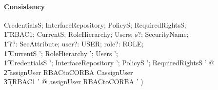 \paragraph{Consistency}
\begin{zed}
  \forall CredentialsS; InterfaceRepository; PolicyS; RequiredRightsS; \\
  \t1 RBAC1; CurrentS; RoleHierarchy; Users; s?: SecurityName; \\
  \t1 r?: SecAttribute; user?: USER; role?: ROLE; \\
  \t1 CurrentS '; RoleHierarchy '; Users '; \\
  \t1 CredentialsS '; InterfaceRepository '; PolicyS '; RequiredRightsS ' @ \\
  \t2 \pre assignUser \land RBACtoCORBA \land CassignUser \implies \\
  \t3 (\exists RBAC1 ' @ assignUser \land RBACtoCORBA ' )
\end{zed}


